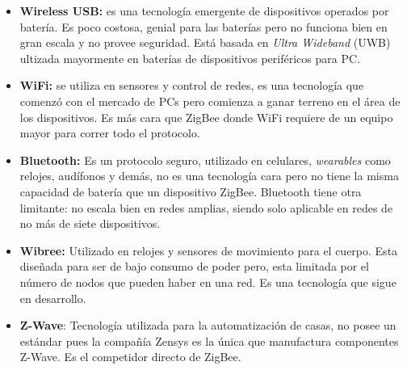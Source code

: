 \documentclass[10pt,journal,compsoc]{IEEEtran}
\begin{document}
\begin{itemize}
  \item \textbf{Wireless USB:} es una tecnología emergente de dispositivos operados por batería. Es poco costosa, genial para las baterías pero no funciona bien en gran escala y no provee seguridad. Está basada en \emph{Ultra Wideband} (UWB) ultizada mayormente en baterías de dispositivos periféricos para PC.
  \item \textbf{WiFi:} se utiliza en sensores y control de redes, es una tecnología que comenzó con el mercado de PCs pero comienza a ganar terreno en el área de los dispositivos. Es más cara que ZigBee donde WiFi requiere de un equipo mayor para correr todo el protocolo. 
  \item \textbf{Bluetooth:} Es un protocolo seguro, utilizado en celulares, \emph{wearables} como relojes, audífonos y demás, no es una tecnología cara pero no tiene la misma capacidad de batería que un dispositivo ZigBee. Bluetooth tiene otra limitante: no escala bien en redes amplias, siendo solo aplicable en redes de no más de siete dispositivos.
  \item \textbf{Wibree:} Utilizado en relojes y sensores de movimiento para el cuerpo. Esta diseñada para ser de bajo consumo de poder pero, esta limitada por el número de nodos que pueden haber en una red. Es una tecnología que sigue en desarrollo. 
  \item \textbf{Z-Wave}: Tecnología utilizada para la automatización de casas, no posee un estándar pues la compañía Zensys es la única que manufactura componentes Z-Wave. Es el competidor directo de ZigBee. 
\end{itemize}




%
%
\end{document}

